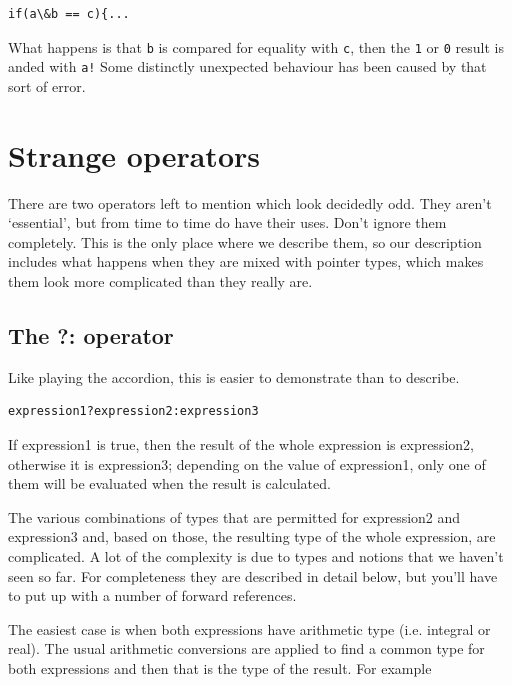   \begin{Verbatim}
if(a\&b == c){...
\end{Verbatim}

  What happens is that \texttt{b} is compared for equality with
   \texttt{c}, then the \texttt{1} or \texttt{0} result is anded
   with \texttt{a!} Some distinctly unexpected behaviour has been caused
   by that sort of error.


 
        \section{Strange operators}
        

  

  There are two operators left to mention which look decidedly odd. They
   aren't `essential', but from time to time do have their uses. Don't
   ignore them completely. This is the only place where we describe them, so
   our description includes what happens when they are mixed with pointer
   types, which makes them look more complicated than they really are.


  \subsection{The ?: operator}
   

   Like playing the accordion, this is easier to demonstrate than to
    describe.


   \begin{Verbatim}
expression1?expression2:expression3
\end{Verbatim}

   If expression1 is true, then the result of the whole
    expression is expression2, otherwise it is
    expression3; depending on the value of expression1,
    only one of them will be evaluated when the result is calculated.


   The various combinations of types that are permitted for
    expression2 and expression3 and, based on those, the
    resulting type of the whole expression, are complicated. A lot of the
    complexity is due to types and notions that we haven't seen so far. For
    completeness they are described in detail below, but you'll have to put up
    with a number of forward references.


   The easiest case is when both expressions have arithmetic type (i.e.
    integral or real). The usual arithmetic conversions are applied to find a
    common type for both expressions and then that is the type of the result.
    For example


